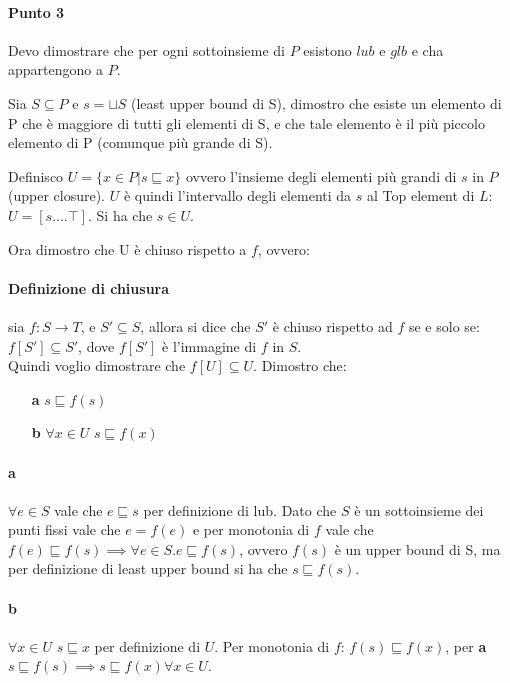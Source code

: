 \documentclass{article}
\begin{document}
\paragraph{Punto 3} Devo dimostrare che per ogni sottoinsieme di $P$ esistono $lub$ e $glb$ e cha appartengono a $P$.

Sia $ S \subseteq P$ e $ s = \sqcup S$ (least upper bound di S), dimostro che esiste un elemento di P che è maggiore di tutti gli elementi di S, e che tale elemento è il più piccolo elemento di P (comunque più grande di S).

Definisco $U = \{ x\in P| s \sqsubseteq x\}$ ovvero l'insieme degli elementi più grandi di $s$ in $P$ (upper closure). $U$ è quindi l'intervallo degli elementi da $s$ al Top element di $L$: $U=[s....\top]$. Si ha che $s \in U$.

Ora dimostro che U è chiuso rispetto a $f$, ovvero:
\paragraph{Definizione di chiusura} sia $f: S \to T$, e $S'\subseteq S$, allora si dice che $S'$ è chiuso rispetto ad $f$ se e solo se:
$f[S'] \subseteq S'$, dove $f[S']$ è l'immagine di $f$ in $S$.\\

Quindi voglio dimostrare che $f[U] \subseteq U$. Dimostro che: 
\begin{itemize}
    \item[\textbf{a}] $s \sqsubseteq f(s)$
    \item[\textbf{b}] $\forall x \in U$ $s \sqsubseteq f(x)$
\end{itemize}

\paragraph{a} $\forall e \in S$ vale che $ e \sqsubseteq s$ per definizione di lub. Dato che $S$ è un sottoinsieme dei punti fissi vale che $ e = f(e)$ e per monotonia di $f $ vale che $f(e) \sqsubseteq f(s) \implies \forall e \in S. e \sqsubseteq f(s)$, ovvero $f(s)$ è un upper bound di S, ma per definizione di least upper bound si ha che $s \sqsubseteq f(s)$.

\paragraph{b} $\forall x \in  U$ $s \sqsubseteq x$ per definizione di $U$. Per monotonia di $f$: $f(s) \sqsubseteq f(x)$, per \textbf{a} $s \sqsubseteq f(s) \implies s \sqsubseteq f(x) \forall x \in U$. \\\\
\end{document}
